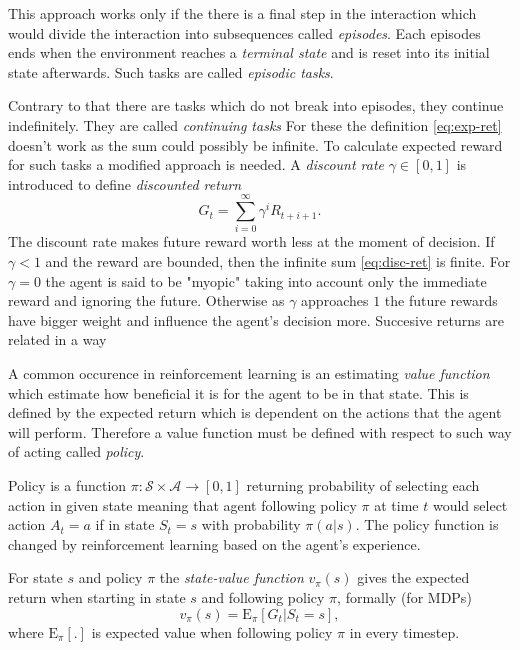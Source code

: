 This approach works only if the there is a final step in the interaction which would divide the interaction into subsequences called \emph{episodes}. Each episodes ends when the environment reaches a \emph{terminal state} and is reset into its initial state afterwards.
Such tasks are called \emph{episodic tasks}. 

Contrary to that there are tasks which do not break into episodes, they continue indefinitely. They are called \emph{continuing tasks} For these the definition \ref{eq:exp-ret} doesn't work as the sum could possibly be infinite. To calculate expected reward for such tasks a modified approach is needed. A \emph{discount rate} $\gamma \in [0,1]$ is introduced to define \emph{discounted return}
\begin{equation}
    \label{eq:disc-ret}
    G_t = \sum_{i=0}^\infty \gamma^iR_{t+i+1}.
\end{equation}
The discount rate makes future reward worth less at the moment of decision. If $\gamma<1$ and the reward are bounded, then the infinite sum \ref{eq:disc-ret} is finite. For $\gamma=0$ the agent is said to be "myopic" taking into account only the immediate reward and ignoring the future. Otherwise as $\gamma$ approaches $1$ the future rewards have bigger weight and influence the agent's decision more.
Succesive returns are related in a way

A common occurence in reinforcement learning is an estimating \emph{value function} which estimate how beneficial it is for the agent to be in that state. This is defined by the expected return which is dependent on the actions that the agent will perform. Therefore a value function must be defined with respect to such way of acting called \emph{policy}.

Policy is a function $\pi: \mathcal{S} \times \mathcal{A} \rightarrow [0,1]$ returning probability of selecting each action in given state meaning that agent following policy $\pi$ at time $t$ would select action $A_t = a$ if in state $S_t =s$ with probability $\pi(a|s)$. The policy function is changed by reinforcement learning based on the agent's experience.

For state $s$ and policy $\pi$ the \emph{state-value function} $v_\pi(s)$ gives the expected return when starting in state $s$ and following policy $\pi$, formally (for MDPs)
\begin{equation}
    v_\pi(s) = \mathrm{E}_\pi[G_t|S_t=s],
\end{equation}
where $\mathrm{E}_\pi[.]$ is expected value when following policy $\pi$ in every timestep. 

